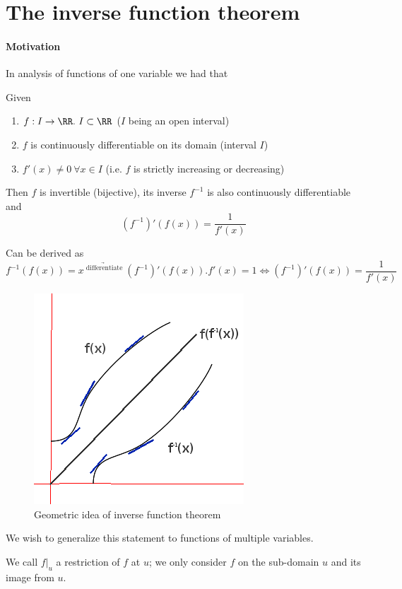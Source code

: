 \section[The inverse function theorem]{The inverse function theorem}
\paragraph{Motivation}
In analysis of functions of one variable we had that
\begin{thm}
Given
\begin{enumerate}
\item $f: I \rightarrow \RR.\ I \subset \RR$ ($I$ being an open interval)
\item $f$ is continuously differentiable on its domain (interval $I$)
\item $f'(x) \neq 0\  \forall x \in I$ (i.e. $f$ is strictly increasing or decreasing)
\end{enumerate}
Then $f$ is invertible (bijective), its inverse $f^{-1}$ is also continuously differentiable and
$$(f^{-1})'(f(x)) = \frac{1}{f'(x)}$$
\end{thm}

\begin{rem}
  Can be derived as $$f^{-1}(f(x)) = x\ \underrightarrow{^\text{differentiate}}\ (f^{-1})'(f(x)).f'(x) = 1 \iff (f^{-1})'(f(x)) = \frac{1}{f'(x)}$$
  \end{rem}

\begin{figure}[hb]
  \center
\caption{Geometric idea of inverse function theorem}
\includegraphics[scale=0.6]{figures/invfuncthm}
\end{figure}

We wish to generalize this statement to functions of multiple variables.
\begin{ldefn}
  We call $f|_u$ a restriction of $f$ at $u$; we only consider $f$ on the sub-domain $u$ and its image from $u$.
\end{ldefn}


